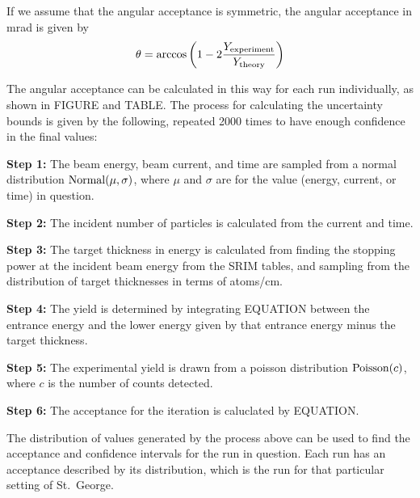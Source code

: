 If we assume that the angular acceptance is symmetric, the angular
acceptance in mrad is given by
\begin{equation}
    \theta = \arccos\left(1 - 2 \frac{Y_{\rm experiment}}{Y_{\rm theory}}\right)
\end{equation}

The angular acceptance can be calculated in this way for each run
individually, as shown in FIGURE and TABLE. The process for calculating
the uncertainty bounds is given by the following, repeated 2000 times to
have enough confidence in the final values:

\textbf{Step 1:}
  The beam energy, beam current, and time are sampled from a normal
  distribution ${\rm Normal}(\mu,\sigma)$, where $\mu$ and $\sigma$ are
  for the value (energy, current, or time) in question.

\textbf{Step 2:}
  The incident number of particles is calculated from the current and
  time.

\textbf{Step 3:}
  The target thickness in energy is calculated from finding the stopping
  power at the incident beam energy from the SRIM tables, and sampling
  from the distribution of target thicknesses in terms of
  atoms/cm\squared{}.

\textbf{Step 4:}
  The yield is determined by integrating EQUATION between the entrance
  energy and the lower energy given by that entrance energy minus the
  target thickness.

\textbf{Step 5:}
  The experimental yield is drawn from a poisson distribution ${\rm
  Poisson}(c)$, where $c$ is the number of counts detected.

\textbf{Step 6:}
  The acceptance for the iteration is caluclated by EQUATION.

The distribution of values generated by the process above can be used to
find the acceptance and confidence intervals for the run in question.
Each run has an acceptance described by its distribution, which is the
run for that particular setting of St.\ George.
